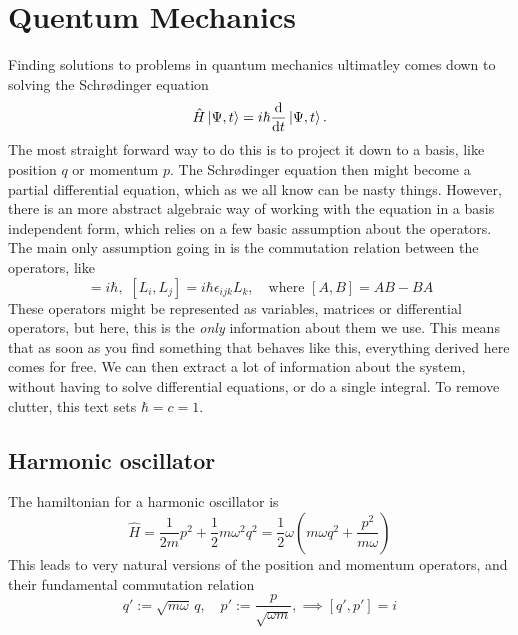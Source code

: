 \section{Quentum Mechanics}


Finding solutions to problems in quantum mechanics ultimatley comes down to solving the Schrødinger equation
\begin{equation*}
    \hat H \ket{\Psi, t} = i \hbar \odv{}{t} \ket{\Psi, t}.
\end{equation*}
The most straight forward way to do this is to project it down to a basis, like position $q$ or momentum $p$. The Schrødinger equation then might become a partial differential equation, which as we all know can be nasty things. However, there is an more abstract algebraic way of working with the equation in a basis independent form, which relies on a few basic assumption about the operators. The main only assumption going in is the commutation relation between the operators, like
\begin{equation*}
[q, p] = i \hbar,\,\, [L_i, L_j] = i \hbar \epsilon_{ijk} L_k, \quad \mathrm{where} \,\, [A, B] = AB - BA
\end{equation*}
These operators might be represented as variables, matrices or differential operators, but here, this is the \emph{only} information about them we use. This means that as soon as you find something that behaves like this, everything derived here comes for free. We can then extract a lot of information about the system, without having to solve differential equations, or do a single integral. To remove clutter, this text sets $\hbar = c = 1$.




\subsection{Harmonic oscillator}

The hamiltonian for a harmonic oscillator is
\begin{equation*}
    \hat H = \frac{1}{2 m} p^2 + \frac{1}{2}m \omega^2 q^2 = \frac{1}{2} \omega \left( m \omega q^2 + \frac{p^2}{m \omega} \right)
\end{equation*}
This leads to very natural versions of the position and momentum operators, and their fundamental commutation relation
\begin{equation}
    \label{position and momentu operators}
    q' := \sqrt{m \omega} \, q, \quad p' := \frac{p}{\sqrt{\omega m}}, \implies [q', p'] = i 
\end{equation}


